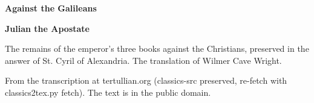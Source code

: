 \documentclass[11pt,letterpaper]{article}
\begin{document}
\color{ink}

\begin{titlepage}
\centering
\vspace*{4em}
{\LARGE\bfseries\color{heading} Against the Galileans\par}
\vspace{2em}
{\Large\bfseries\color{heading} Julian the Apostate\par}
\vspace{2.5em}
{\itshape\color{subhead}\parbox{0.8\linewidth}{\centering The remains of the emperor's three books against the Christians, preserved in the answer of St. Cyril of Alexandria. The translation of Wilmer Cave Wright.\par}}
\vfill
{\small From the transcription at tertullian.org (classics-src preserved, re-fetch with classics2tex.py fetch). The text is in the public domain.\par}
\vspace{2em}
\end{titlepage}

\tableofcontents


\end{document}
